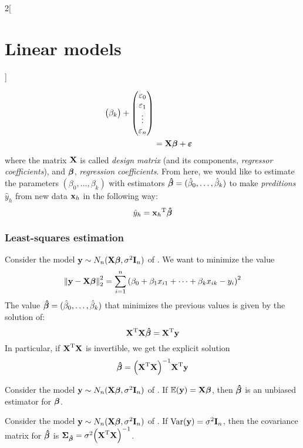 \documentclass[../../../main_math.tex]{subfiles}
\begin{document}
\begin{multicols}{2}[\section{Linear models}]
\begin{definition}
\begin{align}
\begin{pmatrix}
                     \beta_k \\
                   \end{pmatrix}+
      \begin{pmatrix}
        \varepsilon_0 \\
        \varepsilon_1 \\
        \vdots        \\
        \varepsilon_n \\
      \end{pmatrix}                                                \\
      \label{LM:multiple}      & =\boldsymbol{\mathrm{X}}\boldsymbol{\mathrm{\beta}}+\boldsymbol{\mathrm{\varepsilon}}
    \end{align}
    where the matrix $\boldsymbol{\mathrm{X}}$ is called \emph{design matrix} (and its components, \emph{regressor coefficients}), and $\boldsymbol{\mathrm{\beta}}$, \emph{regression coefficients}. From here, we would like to estimate the parameters $(\beta_0,\ldots,\beta_k)$ with estimators $\boldsymbol{\mathrm{\hat\beta}}=(\hat\beta_0,\ldots,\hat\beta_k)$ to make \emph{preditions} $\hat{y}_h$ from new data $\boldsymbol{\mathrm{x}}_h$ in the following way: $$\hat{y}_h={\boldsymbol{\mathrm{x}}_h}^{\mathrm{T}}\boldsymbol{\mathrm{\hat\beta}}$$
  \end{definition}
  \subsubsection{Least-squares estimation}
  \begin{proposition}\label{LM:least-squares}
    Consider the model $\boldsymbol{\mathrm{y}}\sim N_n(\boldsymbol{\mathrm{X\beta}},\sigma^2\boldsymbol{\mathrm{I}}_n)$ of . We want to minimize the value $${\left\|\boldsymbol{\mathrm{y}}-\boldsymbol{\mathrm{X\beta}}\right\|}_2^2=\sum_{i=1}^n{\left(\beta_0+\beta_1x_{i1}+\cdots+\beta_kx_{ik}-y_i\right)}^2$$
    The value $\boldsymbol{\mathrm{\hat\beta}}=(\hat\beta_0,\ldots,\hat\beta_k)$ that minimizes the previous values is given by the solution of: $${\boldsymbol{\mathrm{X}}}^{\mathrm{T}}\boldsymbol{\mathrm{X\hat\beta}}={\boldsymbol{\mathrm{X}}}^{\mathrm{T}}\boldsymbol{\mathrm{y}}$$
    In particular, if ${\boldsymbol{\mathrm{X}}}^{\mathrm{T}}\boldsymbol{\mathrm{X}}$ is invertible, we get the explicit solution $$\boldsymbol{\mathrm{\hat\beta}}={\left({\boldsymbol{\mathrm{X}}}^{\mathrm{T}}\boldsymbol{\mathrm{X}}\right)}^{-1}{\boldsymbol{\mathrm{X}}}^{\mathrm{T}}\boldsymbol{\mathrm{y}}$$
  \end{proposition}
  \begin{proposition}
    Consider the model $\boldsymbol{\mathrm{y}}\sim N_n(\boldsymbol{\mathrm{X\beta}},\sigma^2\boldsymbol{\mathrm{I}}_n)$ of . If $\mathbb{E}(\boldsymbol{\mathrm{y}})=\boldsymbol{\mathrm{X\beta}}$, then $\boldsymbol{\mathrm{\hat\beta}}$ is an unbiased estimator for $\boldsymbol{\mathrm{\beta}}$.
  \end{proposition}
  \begin{proposition}
    Consider the model $\boldsymbol{\mathrm{y}}\sim N_n(\boldsymbol{\mathrm{X\beta}},\sigma^2\boldsymbol{\mathrm{I}}_n)$ of . If $\mathrm{Var}(\boldsymbol{\mathrm{y}})=\sigma^2\boldsymbol{\mathrm{I}}_n$, then the covariance matrix for $\boldsymbol{\mathrm{\hat\beta}}$ is $\boldsymbol{\mathrm{\Sigma}}_{\boldsymbol{\mathrm{\hat\beta}}}=\sigma^2{\left({\boldsymbol{\mathrm{X}}}^{\mathrm{T}}\boldsymbol{\mathrm{X}}\right)}^{-1}$.
  \end{proposition}

\end{multicols}
\end{document}

